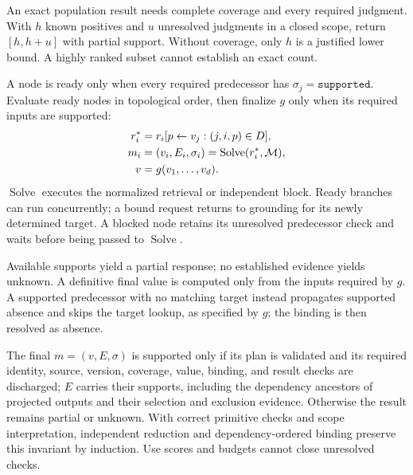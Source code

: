 An exact population result needs complete coverage and every required
judgment. With $h$ known positives and $u$ unresolved judgments in a
closed scope, return $[h,h+u]$ with partial support.
Without coverage, only $h$ is a justified lower bound.
A highly ranked subset cannot establish an exact count.

A node is ready only when every required predecessor has
$\sigma_j=\texttt{supported}$. Evaluate ready nodes in topological
order, then finalize $g$ only when its required inputs are supported:
\begin{equation}
\label{eq:new-compose}
\begin{aligned}
r_i^*&=r_i[p\leftarrow v_j:(j,i,p)\in D],\\
m_i&=(v_i,E_i,\sigma_i)=\operatorname{Solve}(r_i^*,\mathcal{M}),\\
v&=g(v_1,\ldots,v_d).
\end{aligned}
\end{equation}
$\operatorname{Solve}$ executes the normalized retrieval or independent
block. Ready branches can run concurrently; a bound request returns
to grounding for its newly determined target.
A blocked node retains its unresolved predecessor check and waits
before being passed to $\operatorname{Solve}$.

Available supports yield a partial response; no established evidence
yields unknown. A definitive final value is computed only from
the inputs required by $g$.
A supported predecessor with no matching target instead propagates
supported absence and skips the target lookup, as specified by $g$;
the binding is then resolved as absence.

The final $m=(v,E,\sigma)$ is supported only if its plan is validated and
its required identity, source, version, coverage, value, binding, and
result checks are discharged; $E$ carries their
supports, including the dependency ancestors of projected outputs and
their selection and exclusion evidence.
Otherwise the result remains partial or unknown.
With correct primitive checks and scope interpretation, independent
reduction and dependency-ordered binding preserve this invariant by
induction. Use scores and budgets cannot close unresolved checks.

